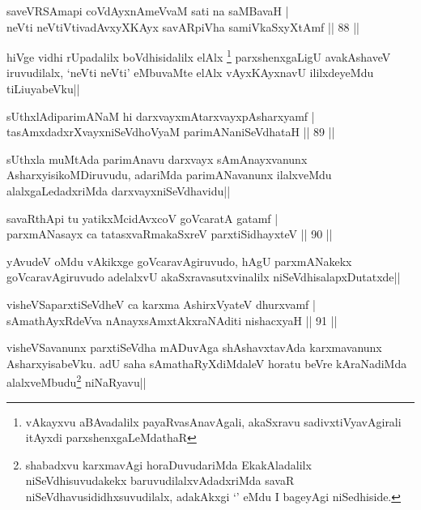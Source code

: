\begin{shl}
saveVRSAmapi coVdAyxnAmeVvaM sati na saMBavaH |\\
neVti neVtiVtivadAvxyXKAyx savAR\s piVha samiVkaSxyXtAmf \hfill || 88 ||
\end{shl}

\begin{artha}
hiVge vidhi rUpadalilx boVdhisidalilx elAlx \footnote[1]{vAkayxvu aBAvadalilx payaRvasAnavAgali, akaSxravu sadivxtiVyavAgirali itAyxdi parxshenxgaLeMdathaR} parxshenxgaLigU avakAshaveV iruvudilalx, `neVti neVti' eMbuvaMte elAlx vAyxKAyxnavU ililxdeyeMdu tiLiuyabeVku||
\end{artha}%

\begin{shl}
sUthxlAdiparimANaM hi darxvayxmAtarxvayxpAsharxyamf |\\
tasAmxdadxrXvayxniSeVdhoV\s yaM parimANaniSeVdhataH \hfill || 89 ||
\end{shl}

\begin{artha}
sUthxla muMtAda parimAnavu darxvayx sAmAnayxvanunx AsharxyisikoMDiruvudu, adariMda parimANavanunx ilalxveMdu alalxgaLedadxriMda darxvayxniSeVdhavidu||
\end{artha}

\begin{shl}
savaRthA\s pi tu yatikxMcidAvxcoV goVcaratA gatamf |\\
parxmANasayx ca tatasxvaRmakaSxreV parxtiSidhayxteV \hfill || 90 ||
\end{shl}

\begin{artha}
yAvudeV oMdu vAkikxge goVcaravAgiruvudo, hAgU parxmANakekx goVcaravAgiruvudo adelalxvU akaSxravasutxvinalilx niSeVdhisalapxDutatxde||
\end{artha}


\begin{shl}
visheVSaparxtiSeVdheV ca karxma AshirxVyateV dhurxvamf |\\
sAmathAyxRdeVva nAnayxsAmxtAkxraNAditi nishacxyaH \hfill || 91 ||
\end{shl}

\begin{artha}
visheVSavanunx parxtiSeVdha mADuvAga shAshavxtavAda karxmavanunx AsharxyisabeVku. adU saha sAmathaRyXdiMdaleV horatu beVre kAraNadiMda alalxveMbudu\footnote[1]{shabadxvu karxmavAgi horaDuvudariMda EkakAladalilx niSeVdhisuvudakekx baruvudilalxvAdadxriMda savaR niSeVdhavusididhxsuvudilalx, adakAkxgi `\stext ' eMdu I bageyAgi niSedhiside.} niNaRyavu||
\end{artha}

